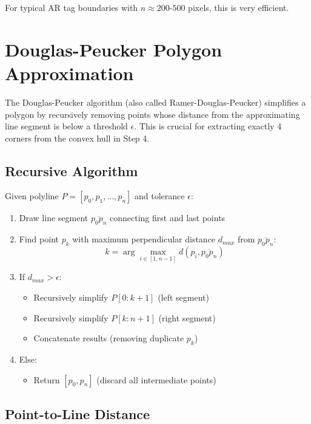 \documentclass[9pt,a4paper,twocolumn,twoside]{tau-class/tau}
\begin{document}
    For typical AR tag boundaries with $n \approx 200$-$500$ pixels, this is very efficient.

\section{Douglas-Peucker Polygon Approximation}

    The Douglas-Peucker algorithm (also called Ramer-Douglas-Peucker) simplifies a polygon by recursively removing points whose distance from the approximating line segment is below a threshold $\epsilon$. This is crucial for extracting exactly 4 corners from the convex hull in Step 4.

    \subsection{Recursive Algorithm}

    Given polyline $P = [p_0, p_1, \ldots, p_n]$ and tolerance $\epsilon$:

    \begin{enumerate}
        \item Draw line segment $\overline{p_0 p_n}$ connecting first and last points
        \item Find point $p_k$ with maximum perpendicular distance $d_{max}$ from $\overline{p_0 p_n}$:
        \begin{equation}
            k = \arg\max_{i \in [1, n-1]} d(p_i, \overline{p_0 p_n})
        \end{equation}
        \item If $d_{max} > \epsilon$:
        \begin{itemize}
            \item Recursively simplify $P[0:k+1]$ (left segment)
            \item Recursively simplify $P[k:n+1]$ (right segment)
            \item Concatenate results (removing duplicate $p_k$)
        \end{itemize}
        \item Else:
        \begin{itemize}
            \item Return $[p_0, p_n]$ (discard all intermediate points)
        \end{itemize}
    \end{enumerate}

    \subsection{Point-to-Line Distance}
\end{document}
